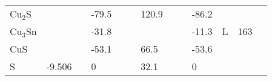 \begin{landscape}
\begin{center}
\begin{longtable}{|l|p{2.5cm}|l|p{2.5cm}|l|l|p{2.5cm}|l|l|p{2.5cm}|l|l|l|}
Cu$_2$S           	   &                            &     & -79.5               &     &         & 120.9              &     & \citep{Haynes2013} & -86.2                               &     & \citep{Haynes2013} &  \\
Cu$_3$Sn          	   &                            &     & -31.8               &     & \citep{Wagman1982}     &                    &     &     & -11.3                             & L   & 163 &  \\
CuS              	   &                            &     & -53.1               &     & \citep{Haynes2013}     & 66.5               &     & \citep{Haynes2013} & -53.6                               &     & \citep{Haynes2013} &  \\
S                	   & -9.506                     & \citep{Barin1977} & 0                   &     & \citep{Haynes2013}     & 32.1               &     & \citep{Haynes2013} & 0                                   &     & \citep{Haynes2013} &  \\

\end{longtable}
\end{center}
\end{landscape}
